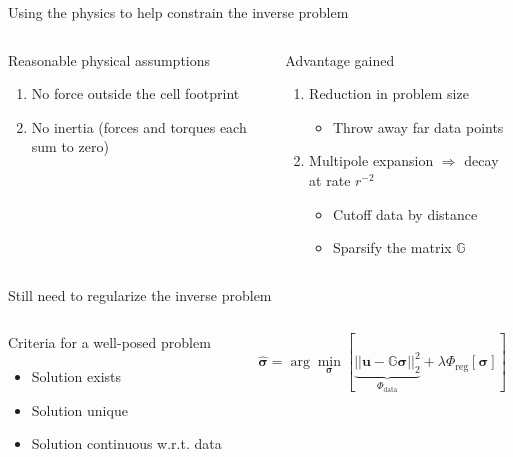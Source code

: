\documentclass[presentation,aspectratio=169]{beamer}
\newcommand{\bsigma}{\boldsymbol\sigma}
\begin{document}
\begin{frame}{Using the physics to help constrain the inverse problem}
\small
\begin{columns}
\begin{column}{0.4\textwidth}
\begin{block}{Reasonable physical assumptions}
\begin{enumerate}
\item No force outside the cell footprint
\item No inertia (forces and torques each sum to zero)
\end{enumerate}
\end{block}
\end{column}
\begin{column}{0.5\textwidth}
 
\begin{block}{Advantage gained}
\begin{enumerate} \scriptsize
\item Reduction in problem size
\begin{itemize} \scriptsize
\item Throw away far data points
\end{itemize}
\item Multipole expansion $\Rightarrow$  decay at rate $r^{-2}$
\begin{itemize} \scriptsize
\item Cutoff data by distance
\item Sparsify the matrix $\mathbb{G}$
\end{itemize}
\end{enumerate}
\end{block}
\end{column}
\end{columns}

\begin{exampleblock}{Still need to regularize the inverse problem}

\begin{columns}
\begin{column}{0.4\textwidth}

Criteria for a well-posed problem
\begin{itemize}
\item Solution exists
\item Solution unique
\item Solution continuous w.r.t. data
\end{itemize}
\end{column}
\begin{column}{0.55\textwidth} \Large
\[
\hat{\boldsymbol\sigma} = \arg\min_{\boldsymbol\sigma}\left[ \underbrace{||\mathbf{u} - \mathbb{G}\mathbf{\bsigma}  ||_2^2}_{\Phi_{\textrm{data}}} + \lambda\Phi_{\textrm{reg}}[\boldsymbol\sigma] \right]
\]
\end{column}
\end{columns}

\end{exampleblock}

\end{frame}
\end{document}
